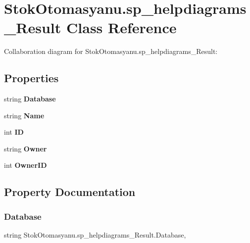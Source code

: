 \section{Stok\+Otomasyanu.\+sp\+\_\+helpdiagrams\+\_\+\+Result Class Reference}
\label{class_stok_otomasyanu_1_1sp__helpdiagrams___result}


Collaboration diagram for Stok\+Otomasyanu.\+sp\+\_\+helpdiagrams\+\_\+\+Result\+:
\subsection*{Properties}
\begin{DoxyCompactItemize}
\item 
string \textbf{ Database}\hspace{0.3cm}{\ttfamily  [get, set]}
\item 
string \textbf{ Name}\hspace{0.3cm}{\ttfamily  [get, set]}
\item 
int \textbf{ ID}\hspace{0.3cm}{\ttfamily  [get, set]}
\item 
string \textbf{ Owner}\hspace{0.3cm}{\ttfamily  [get, set]}
\item 
int \textbf{ Owner\+ID}\hspace{0.3cm}{\ttfamily  [get, set]}
\end{DoxyCompactItemize}


\subsection{Property Documentation}
\mbox{\label{class_stok_otomasyanu_1_1sp__helpdiagrams___result_adb07dbad8b1d16524a04adff40ef96e6}} 
\subsubsection{Database}
{\footnotesize\ttfamily string Stok\+Otomasyanu.\+sp\+\_\+helpdiagrams\+\_\+\+Result.\+Database\hspace{0.3cm}{\ttfamily [get]}, {\ttfamily [set]}}

